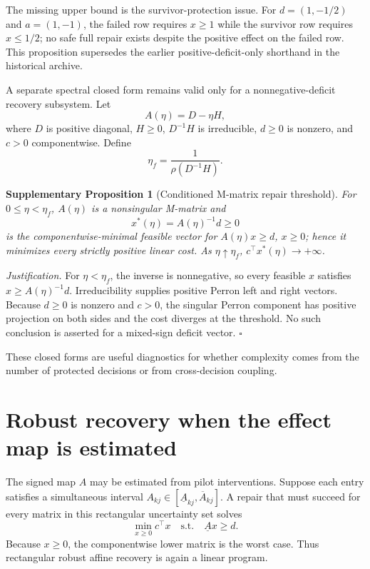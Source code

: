 \documentclass[11pt,letterpaper]{article}
\theoremstyle{plain}
\newtheorem{proposition}{Supplementary Proposition}
\newcommand{\1}{\mathbf 1}
\begin{document}
The missing upper bound is the survivor-protection issue. For $d=(1,-1/2)$ and $a=(1,-1)$, the failed row requires $x\ge1$ while the survivor row requires $x\le1/2$; no safe full repair exists despite the positive effect on the failed row. This proposition supersedes the earlier positive-deficit-only shorthand in the historical archive.

A separate spectral closed form remains valid only for a nonnegative-deficit recovery subsystem. Let
\begin{equation}
 A(\eta)=D-\eta H,
\label{eq:r137_Meta}
\end{equation}
where $D$ is positive diagonal, $H\ge0$, $D^{-1}H$ is irreducible, $d\ge0$ is nonzero, and $c>0$ componentwise. Define
\begin{equation}
 \eta_f=\frac{1}{\rho(D^{-1}H)}.
\label{eq:r137_etaf}
\end{equation}
\begin{proposition}[Conditioned M-matrix repair threshold]
For $0\le\eta<\eta_f$, $A(\eta)$ is a nonsingular M-matrix and
\begin{equation}
 x^*(\eta)=A(\eta)^{-1}d\ge0
\label{eq:r137_Mxstar}
\end{equation}
is the componentwise-minimal feasible vector for $A(\eta)x\ge d$, $x\ge0$; hence it minimizes every strictly positive linear cost. As $\eta\uparrow\eta_f$, $c^\top x^*(\eta)\to+\infty$.
\end{proposition}
\textit{Justification.} For $\eta<\eta_f$, the inverse is nonnegative, so every feasible $x$ satisfies $x\ge A(\eta)^{-1}d$. Irreducibility supplies positive Perron left and right vectors. Because $d\ge0$ is nonzero and $c>0$, the singular Perron component has positive projection on both sides and the cost diverges at the threshold. No such conclusion is asserted for a mixed-sign deficit vector. $\square$

These closed forms are useful diagnostics for whether complexity comes from the number of protected decisions or from cross-decision coupling.

\section{Robust recovery when the effect map is estimated}
The signed map $A$ may be estimated from pilot interventions. Suppose each entry satisfies a simultaneous interval $A_{kj}\in[\underline A_{kj},\overline A_{kj}]$. A repair that must succeed for every matrix in this rectangular uncertainty set solves
\begin{equation}
 \min_{x\ge0}c^\top x
\quad\text{s.t.}\quad
 \underline A x\ge d.
\label{eq:s_robust_rect}
\end{equation}
Because $x\ge0$, the componentwise lower matrix is the worst case. Thus rectangular robust affine recovery is again a linear program.
\end{document}
